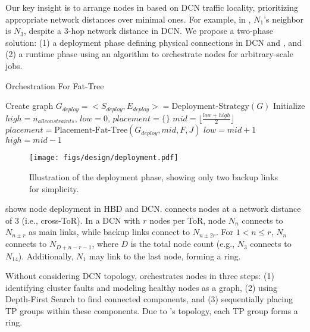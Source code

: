 Our key insight is to arrange nodes in \sys{} based on DCN traffic locality, prioritizing appropriate network distances over minimal ones. For example, in , $N_1$'s \sys{} neighbor is $N_3$, despite a 3-hop network distance in DCN. We propose a two-phase solution: (1) a deployment phase defining physical connections in DCN and \sys{}, and (2) a runtime phase using an algorithm to orchestrate nodes for arbitrary-scale jobs. 

\vspace{-1em}
\begin{algorithm}[h!t]
\small
\caption{Orchestration For Fat-Tree}
\label{alg:orchestration-fat-tree-overview}
 Create graph $G_{deploy}=<S_{deploy},E_{deploy}>=\text{Deployment-Strategy}(G)$\;
 Initialize $high=n_{allconstraints}$, $low=0$, $placement =\{\}$\;
{
     $mid=\lfloor \frac{low+high}{2} \rfloor$\;
     $placement=\text{Placement-Fat-Tree}(G_{deploy},mid,F,J)$\;
    {
         $low=mid+1$\;
    }
    {
         $high=mid-1$\;
    }
}
\end{algorithm}
\vspace{-1em}

\begin{figure}[h!t]
    \centering
    \texttt{[image: figs/design/deployment.pdf]}
    \vspace{-1em}
    \caption{Illustration of the deployment phase, showing only two backup links for simplicity.}
    \label{fig:fat-tree-topo}
    \vspace{-8pt}
\end{figure}


  shows node deployment in HBD and DCN. \sys{} connects nodes at a network distance of 3 (i.e., cross-ToR). In a DCN with $r$ nodes per ToR, node $N_n$ connects to $N_{n\pm r}$ as main links, while backup links connect to $N_{n\pm 2r}$. For $1 < n \le r$, $N_n$ connects to $N_{D + n - r - 1}$, where $D$ is the total node count (e.g., $N_3$ connects to $N_{14}$). Additionally, $N_1$ may link to the last node, forming a ring.




 Without considering DCN topology, \sys{} orchestrates nodes in three steps: (1) identifying cluster faults and modeling healthy nodes as a graph, (2) using Depth-First Search to find connected components, and (3) sequentially placing TP groups within these components. Due to \sys{}’s topology, each TP group forms a ring.  


